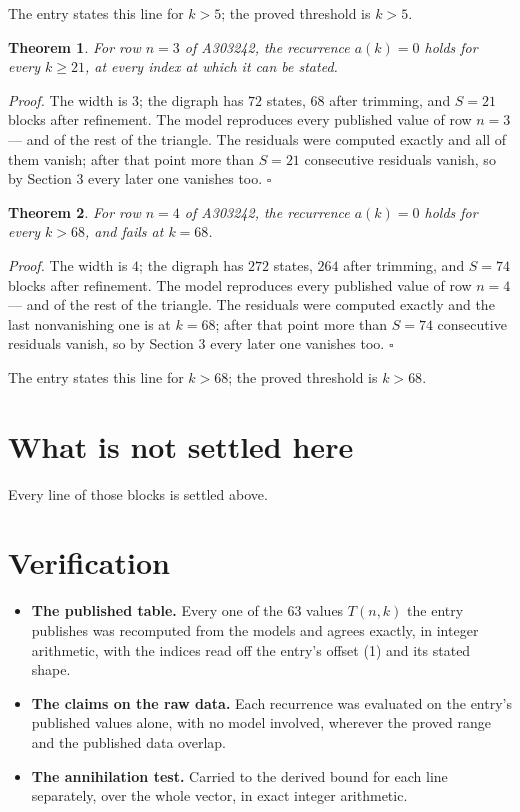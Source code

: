 \documentclass[11pt]{article}
\newtheorem{theorem}{Theorem}
\theoremstyle{definition}
\begin{document}
The entry states this line for $k > 5$; the proved threshold is $k > 5$.

\begin{theorem} For row $n = 3$ of A303242, the recurrence $a(k) = 0$ holds for every $k \ge 21$, at every index at which it can be stated.\end{theorem}

{\itshape Proof.} The width is $3$; the digraph has $72$ states, $68$ after trimming, and $S = 21$ blocks after refinement. The model reproduces every published value of row $n = 3$ --- and of the rest of the triangle. The residuals were computed exactly and all of them vanish; after that point more than $S = 21$ consecutive residuals vanish, so by Section 3 every later one vanishes too. $\square$

\begin{theorem} For row $n = 4$ of A303242, the recurrence $a(k) = 0$ holds for every $k > 68$, and fails at $k = 68$.\end{theorem}

{\itshape Proof.} The width is $4$; the digraph has $272$ states, $264$ after trimming, and $S = 74$ blocks after refinement. The model reproduces every published value of row $n = 4$ --- and of the rest of the triangle. The residuals were computed exactly and the last nonvanishing one is at $k = 68$; after that point more than $S = 74$ consecutive residuals vanish, so by Section 3 every later one vanishes too. $\square$

The entry states this line for $k > 68$; the proved threshold is $k > 68$.

\section{What is not settled here}

Every line of those blocks is settled above.

\section{Verification}

\begin{itemize}

\item {\bfseries The published table.} Every one of the 63 values $T(n,k)$ the entry publishes was recomputed from the models and agrees exactly, in integer arithmetic, with the indices read off the entry's offset (1) and its stated shape.

\item {\bfseries The claims on the raw data.} Each recurrence was evaluated on the entry's published values alone, with no model involved, wherever the proved range and the published data overlap.

\item {\bfseries The annihilation test.} Carried to the derived bound for each line separately, over the whole vector, in exact integer arithmetic.

\end{itemize}
\end{document}

